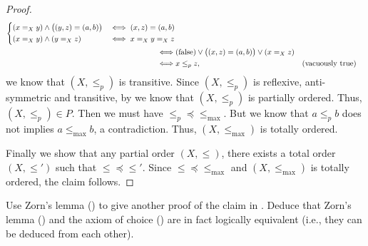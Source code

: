 \begin{proof}
\begin{align*}
\begin{dcases}
             (x =_X y) \land \big((y, z) = (a, b)\big)                 & \iff (x, z) = (a, b) \\
             (x =_X y) \land (y =_X z)                                 & \iff x =_X y =_X z
           \end{dcases}                                 \\
    \iff & (\text{false}) \lor \big((x, z) = (a, b)\big) \lor (x =_X z)                                                     \\
    \iff & x \leq_p z,                                                                         &  & \text{(vacuously true)}
  \end{align*}
  we know that \((X, \leq_p)\) is transitive.
  Since \((X, \leq_p)\) is reflexive, anti-symmetric and transitive, by  we know that \((X, \leq_p)\) is partially ordered.
  Thus, \((X, \leq_p) \in P\).
  Then we must have \(\leq_p \preceq \leq_{\max}\).
  But we know that \(a \leq_p b\) does not implies \(a \leq_{\max} b\), a contradiction.
  Thus, \((X, \leq_{\max})\) is totally ordered.

  Finally we show that any partial order \((X, \leq)\), there exists a total order \((X, \leq')\) such that \(\leq \preceq \leq'\).
  Since \(\leq \preceq \leq_{\max}\) and \((X, \leq_{\max})\) is totally ordered, the claim follows.
\end{proof}

\begin{ex}\label{i:ex:8.5.17}
  Use Zorn's lemma () to give another proof of the claim in .
  Deduce that Zorn's lemma () and the axiom of choice () are in fact logically equivalent
  (i.e., they can be deduced from each other).
\end{ex}

